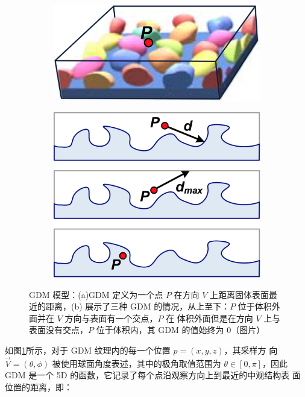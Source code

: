 \begin{figure}
	\begin{subfigure}[b]{0.49\textwidth}
		\includegraphics[width=\textwidth]{figures/df/GDM-model-1}
		\caption{}
	\end{subfigure}
	\begin{subfigure}[b]{0.51\textwidth}
		\includegraphics[width=\textwidth]{figures/df/GDM-model-2}
		\caption{}
	\end{subfigure}
	\caption{GDM 模型：(a)GDM 定义为一个点 $P$ 在方向 $V$ 上距离固体表面最近的距离，(b) 展示了三种 GDM 的情况，从上至下：$P$ 位于体积外面并在 $V$ 方向与表面有一个交点，$P$ 在 体积外面但是在方向 $V$ 上与表面没有交点，$P$ 位于体积内，其 GDM 的值始终为 0（图片\cite{a:GeneralizedDisplacementMaps}）}
	\label{f:df-GDM-model}
\end{figure}

如图\ref{f:df-GDM-model}所示，对于 GDM 纹理内的每一个位置 $p = (x, y, z)$，其采样方 向 $\vec{V} = (\theta,\phi)$ 被使用球面角度表述，其中的极角取值范围为 $\theta\in  [0,\pi]$，因此 GDM 是一个 5D 的函数，它记录了每个点沿观察方向上到最近的中观结构表 面位置的距离，即：

